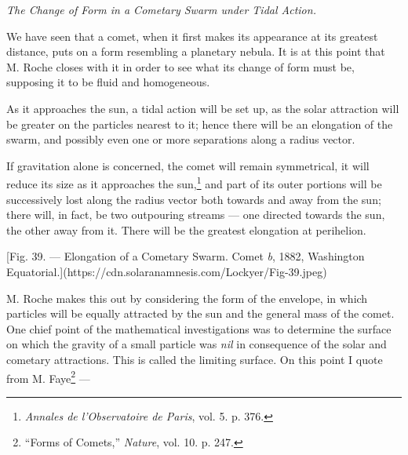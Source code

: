 \documentclass[a4paper, 12pt, oneside, polutonikogreek, english]{article}
\begin{document}
\emph{The Change of Form in a Cometary Swarm under Tidal Action.}

We have seen that a comet, when it first makes its appearance at its greatest distance, puts on a form resembling a planetary nebula. It is at this point that M. Roche closes with it in order to see what its change of form must be, supposing it to be fluid and homogeneous.

As it approaches the sun, a tidal action will be set up, as the solar attraction will be greater on the particles nearest to it; hence there will be an elongation of the swarm, and possibly even one or more separations along a radius vector.

If gravitation alone is concerned, the comet will remain symmetrical, it will reduce its size as it approaches the sun,\footnote{\emph{Annales de l'Observatoire de Paris}, vol. 5. p. 376.} and part of its outer portions will be successively lost along the radius vector both towards and away from the sun; there will, in fact, be two outpouring streams --- one directed towards the sun, the other away from it. There will be the greatest elongation at perihelion.

[Fig. 39. --- Elongation of a Cometary Swarm. Comet \emph{b}, 1882, Washington Equatorial.](https://cdn.solaranamnesis.com/Lockyer/Fig-39.jpeg)

M. Roche makes this out by considering the form of the envelope, in which particles will be equally attracted by the sun and the general mass of the comet. One chief point of the mathematical investigations was to determine the surface on which the gravity of a small particle was \emph{nil} in consequence of the solar and cometary attractions. This is called the limiting surface. On this point I quote from M. Faye\footnote{``Forms of Comets,'' \emph{Nature}, vol. 10. p. 247.} ---
\end{document}
